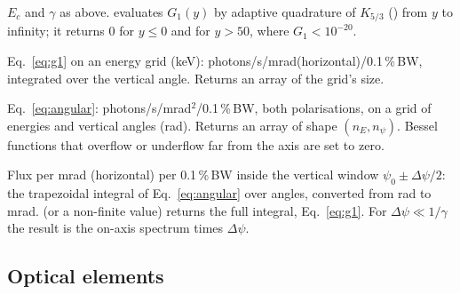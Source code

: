 $E_c$ and $\gamma$ as above.  evaluates $G_1(y)$ by adaptive quadrature of
$K_{5/3}$ () from $y$ to infinity; it returns 0 for $y\le0$ and for
$y>50$, where $G_1 < 10^{-20}$.

Eq.~\eqref{eq:g1} on an energy grid (keV): photons/s/mrad(horizontal)/0.1\,\%\,BW, integrated
over the vertical angle. Returns an array of the grid's size.

Eq.~\eqref{eq:angular}: photons/s/mrad$^2$/0.1\,\%\,BW, both polarisations, on a grid of
energies and vertical angles (\textmu rad). Returns an array of shape $(n_E, n_\psi)$.
Bessel functions that overflow or underflow far from the axis are set to zero.

Flux per mrad (horizontal) per 0.1\,\%\,BW inside the vertical window
$\psi_0 \pm \Delta\psi/2$: the trapezoidal integral of Eq.~\eqref{eq:angular} over
 angles, converted from \textmu rad to mrad.  (or a non-finite value)
returns the full integral, Eq.~\eqref{eq:g1}. For $\Delta\psi \ll 1/\gamma$ the result is the
on-axis spectrum times $\Delta\psi$.

\subsection{Optical elements}

